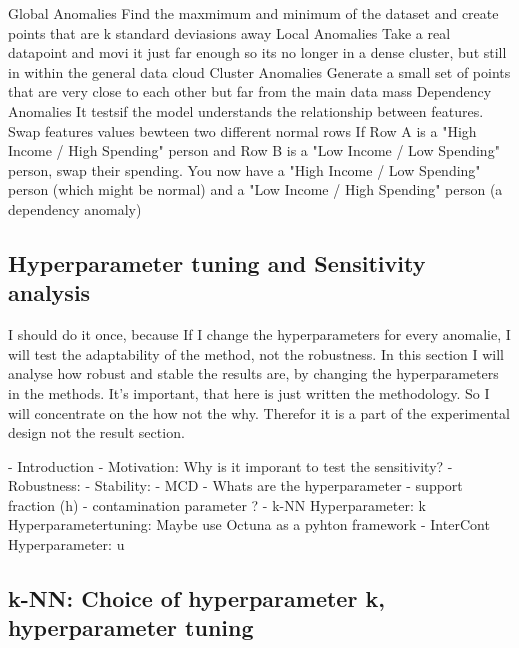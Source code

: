 Global Anomalies 
    Find the maxmimum and minimum of the dataset and create points that are k standard deviasions away
Local Anomalies
    Take a real datapoint and movi it just far enough so its no longer in a dense cluster, but still in within the general data cloud
Cluster Anomalies
    Generate a small set of points that are very close to each other but far from the main data mass
Dependency Anomalies
    It testsif the model understands the relationship between features. Swap features values bewteen two different normal rows
    If Row A is a "High Income / High Spending" person and Row B is a "Low Income / Low Spending" person, swap their spending. 
    You now have a "High Income / Low Spending" person (which might be normal) and a "Low Income / High Spending" person (a dependency anomaly)

\subsection{Hyperparameter tuning and Sensitivity analysis}
I should do it once, because If I change the hyperparameters for every anomalie, I will test the adaptability of the method, not the robustness.
In this section I will analyse how robust and stable the results are, by changing the hyperparameters in the methods.
It's important, that here is just written the methodology. 
So I will concentrate on the how not the why. 
Therefor it is a part of the experimental design not the result section.

- Introduction 
    - Motivation: Why is it imporant to test the sensitivity?
    - Robustness: 
    - Stability: 
- MCD
    - Whats are the hyperparameter - support fraction (h)
    - contamination parameter ?
- k-NN  
    Hyperparameter: k 
    Hyperparametertuning: Maybe use Octuna as a pyhton framework
- InterCont
    Hyperparameter: u 


\subsection{k-NN: Choice of hyperparameter k, hyperparameter tuning}
